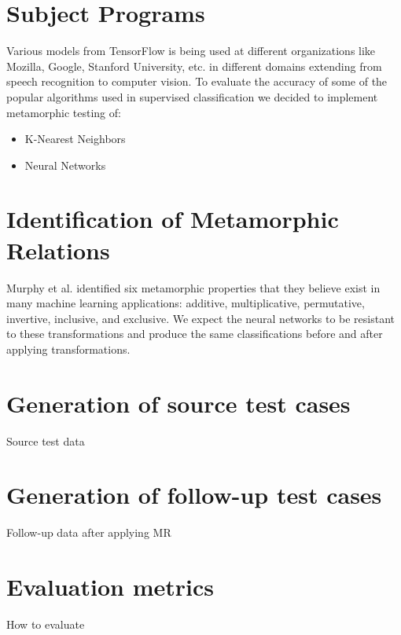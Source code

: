 \section{Subject Programs}
Various models from TensorFlow is being used at different organizations like Mozilla, Google, Stanford University, etc. in different domains extending from speech recognition to computer vision. To evaluate the accuracy of some of the popular algorithms used in supervised classification we decided to implement metamorphic testing of:
\begin{itemize}
\item K-Nearest Neighbors
\item Neural Networks
\end{itemize}

\section{Identification of Metamorphic Relations} \label{MRused}
Murphy et al. \cite{Murphy} identified six metamorphic properties that they believe exist in many machine learning applications: additive, multiplicative, permutative, invertive, inclusive, and exclusive. We expect the neural networks to be resistant to these transformations and produce the same classifications before and after applying transformations.

\section{Generation of source test cases}
Source test data

\section{Generation of follow-up test cases}
Follow-up data after applying MR

\section{Evaluation metrics}
How to evaluate
